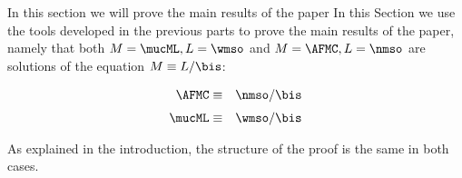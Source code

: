 
In this section we will prove the main results of the paper
In this Section we use the tools developed in the previous parts to prove  the
main results of the paper, namely that both $M=\mucML, L=\wmso$ and  $M=\AFMC,
L=\nmso$ are  solutions of the equation $M \equiv L / {\bis}$:

\begin{eqnarray}
   \AFMC &\equiv& \nmso / {\bis} 
   \label{eq:z1}
\\[1mm] \mucML &\equiv& \wmso / {\bis} 
   \label{eq:z2}
\end{eqnarray}

As explained in the introduction, the structure of the proof is the same in both 
cases. 

